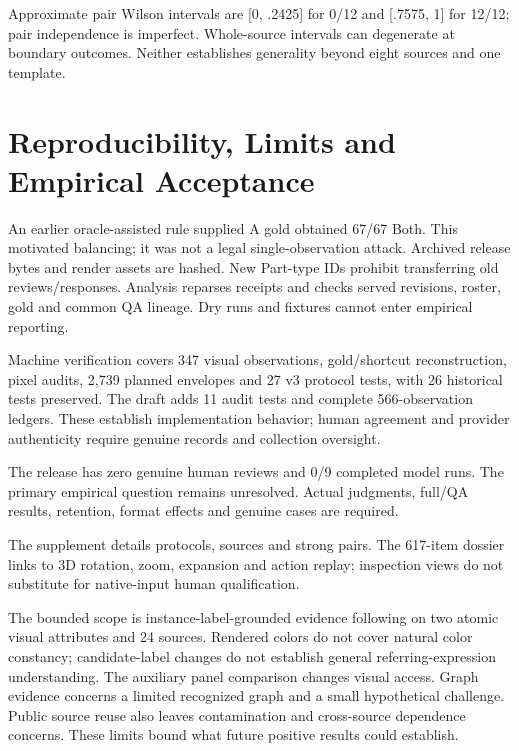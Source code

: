 \documentclass[10pt,twocolumn,letterpaper]{article}
\begin{document}
Approximate pair Wilson intervals are [0, .2425] for 0/12 and
[.7575, 1] for 12/12; pair independence is imperfect.
Whole-source intervals can degenerate at boundary outcomes.
Neither establishes generality beyond eight sources and one template.

\section{Reproducibility, Limits and Empirical Acceptance}
An earlier oracle-assisted rule supplied A gold obtained 67/67 Both.
This motivated balancing; it was not a legal single-observation attack.
Archived release bytes and render assets are hashed. New Part-type IDs
prohibit transferring old reviews/responses. Analysis reparses receipts
and checks served revisions, roster, gold and common QA lineage.
Dry runs and fixtures cannot enter empirical reporting.

Machine verification covers 347 visual observations, gold/shortcut
reconstruction, pixel audits, 2,739 planned envelopes and 27 v3 protocol
tests, with 26 historical tests preserved. The draft adds 11 audit tests
and complete 566-observation ledgers. These establish implementation
behavior; human agreement and provider authenticity require genuine
records and collection oversight.

The release has zero genuine human reviews and 0/9 completed model runs.
The primary empirical question remains unresolved. Actual judgments,
full/QA results, retention, format effects and genuine cases are required.

The supplement details protocols, sources and strong pairs. The
617-item dossier links to 3D rotation, zoom, expansion and action replay;
inspection views do not substitute for native-input human qualification.

The bounded scope is instance-label-grounded evidence following on
two atomic visual attributes and 24 sources. Rendered colors do not
cover natural color constancy; candidate-label changes do not establish
general referring-expression understanding. The auxiliary panel
comparison changes visual access. Graph evidence concerns a limited
recognized graph and a small hypothetical challenge. Public source
reuse also leaves contamination and cross-source dependence concerns.
These limits bound what future positive results could establish.

\clearpage
{\small


}
\end{document}

